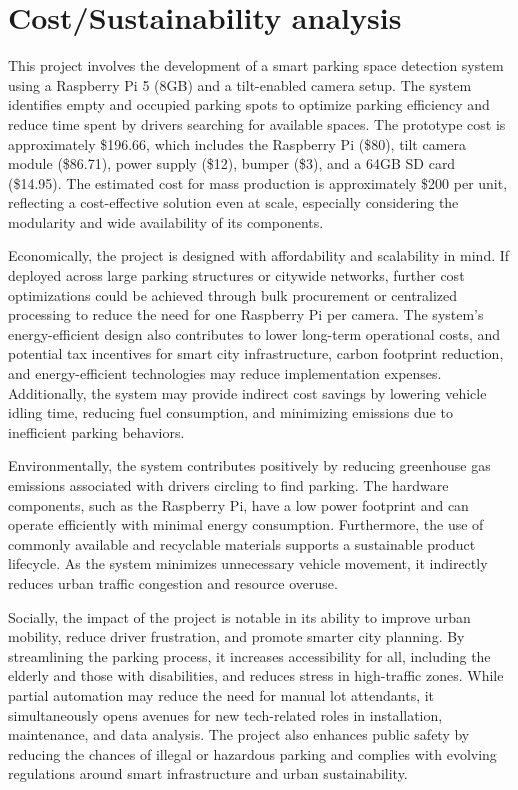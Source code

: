\documentclass[conference]{IEEEtran}
\begin{document}
\section{Cost/Sustainability analysis}

This project involves the development of a smart parking space detection system using a Raspberry Pi 5 (8GB) and a tilt-enabled camera setup. 
The system identifies empty and occupied parking spots to optimize parking efficiency and reduce time spent by drivers searching for available spaces. 
The prototype cost is approximately \$196.66, 
which includes the Raspberry Pi (\$80), 
tilt camera module (\$86.71), 
power supply (\$12), 
bumper (\$3), 
and a 64GB SD card (\$14.95). 
The estimated cost for mass production is approximately \$200 per unit, 
reflecting a cost-effective solution even at scale, 
especially considering the modularity and wide availability of its components.

Economically, 
the project is designed with affordability and scalability in mind. 
If deployed across large parking structures or citywide networks, 
further cost optimizations could be achieved through bulk procurement or centralized processing to reduce the need for one Raspberry Pi per camera. 
The system’s energy-efficient design also contributes to lower long-term operational costs, 
and potential tax incentives for smart city infrastructure, 
carbon footprint reduction, 
and energy-efficient technologies may reduce implementation expenses. 
Additionally, 
the system may provide indirect cost savings by lowering vehicle idling time, 
reducing fuel consumption, 
and minimizing emissions due to inefficient parking behaviors.

Environmentally, 
the system contributes positively by reducing greenhouse gas emissions associated with drivers circling to find parking. 
The hardware components, 
such as the Raspberry Pi, 
have a low power footprint and can operate efficiently with minimal energy consumption. 
Furthermore, 
the use of commonly available and recyclable materials supports a sustainable product lifecycle. 
As the system minimizes unnecessary vehicle movement, 
it indirectly reduces urban traffic congestion and resource overuse.

Socially, 
the impact of the project is notable in its ability to improve urban mobility, 
reduce driver frustration, 
and promote smarter city planning. 
By streamlining the parking process, 
it increases accessibility for all, 
including the elderly and those with disabilities, 
and reduces stress in high-traffic zones. 
While partial automation may reduce the need for manual lot attendants, 
it simultaneously opens avenues for new tech-related roles in installation, 
maintenance, 
and data analysis.
The project also enhances public safety by reducing the chances of illegal or hazardous parking and complies with evolving regulations around smart infrastructure and urban sustainability.
\end{document}
